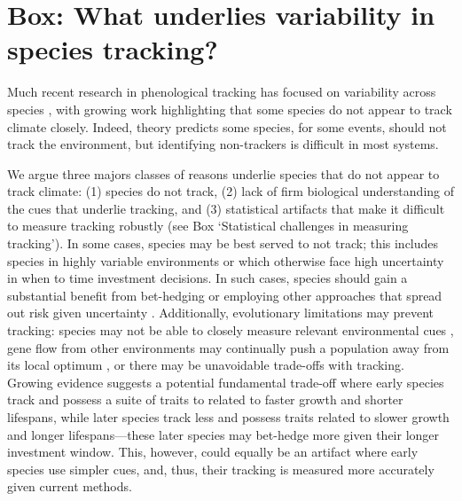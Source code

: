 \documentclass[11pt,letterpaper]{article}
\begin{document}
\section{Box: What underlies variability in species tracking?}
Much recent research in phenological tracking has focused on variability across species \citep[e.g.,][]{Willis:2008bf,Cook:2012pnas,bolmgren2013,CaraDonna2014}, with growing work highlighting that some species do not appear to track climate closely. Indeed, theory predicts some species, for some events, should not track the environment, but identifying non-trackers is difficult in most systems. %

We argue three majors classes of reasons underlie species that do not appear to track climate: (1) species do not track, (2) lack of firm biological understanding of the cues that underlie tracking, and (3) statistical artifacts that make it difficult to measure tracking robustly (see Box `Statistical challenges in measuring tracking'). In some cases, species may be best served to not track; this includes species in highly variable environments or which otherwise face high uncertainty in when to time investment decisions. In such cases, species should gain a substantial benefit from bet-hedging or employing other approaches that spread out risk given uncertainty \citep{Venable:2007os,donald2013}. Additionally, evolutionary limitations may prevent tracking: species may not be able to closely measure relevant environmental cues \citep{arnold1992,Singer:2010eb}, gene flow from other environments may continually push a population away from its local optimum \citep{lenormand2002}, or there may be unavoidable trade-offs \citep{levins1968} with tracking.  Growing evidence suggests a potential fundamental trade-off where early species track and possess a suite of traits to related to faster growth and shorter lifespans, while later species track less and possess traits related to slower growth and longer lifespans---these later species may bet-hedge more given their longer investment window. This, however, could equally be an artifact where early species use simpler cues, and, thus, their tracking is measured more accurately given current methods. 
\end{document}
